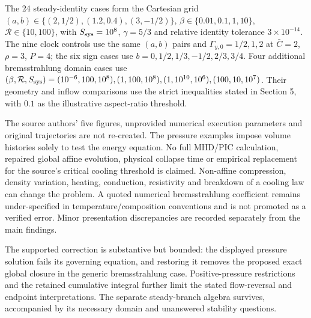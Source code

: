 The 24 steady-identity cases form the Cartesian grid
\((a,b)\in\{(2,1/2),(1.2,0.4),(3,-1/2)\}\),
\(\beta\in\{0.01,0.1,1,10\}\), \(\mathcal R\in\{10,100\}\), with
\(S_{\rm sys}=10^8\), \(\gamma=5/3\) and relative identity tolerance
\(3\times10^{-14}\). The nine clock controls use the same \((a,b)\)
pairs and \(\Gamma_{y,0}=1/2,1,2\) at \(\bar C=2\), \(\rho=3\), \(P=4\);
the six sign cases use \(b=0,1/2,1/3,-1/2,2/3,3/4\). Four additional
bremsstrahlung domain cases use
\((\beta,\mathcal R,S_{\rm sys})=(10^{-6},100,10^8),(1,100,10^8),(1,10^{10},10^6),(100,10,10^7)\).
Their geometry and inflow comparisons use the strict inequalities stated
in Section 5, with \(0.1\) as the illustrative aspect-ratio threshold.

The source authors' five figures, unprovided numerical execution
parameters and original trajectories are not re-created. The pressure
examples impose volume histories solely to test the energy equation. No
full MHD/PIC calculation, repaired global affine evolution, physical
collapse time or empirical replacement for the source's critical cooling
threshold is claimed. Non-affine compression, density variation,
heating, conduction, resistivity and breakdown of a cooling law can
change the problem. A quoted numerical bremsstrahlung coefficient
remains under-specified in temperature/composition conventions and is
not promoted as a verified error. Minor presentation discrepancies are
recorded separately from the main findings.

The supported correction is substantive but bounded: the displayed
pressure solution fails its governing equation, and restoring it removes
the proposed exact global closure in the generic bremsstrahlung case.
Positive-pressure restrictions and the retained cumulative integral
further limit the stated flow-reversal and endpoint interpretations. The
separate steady-branch algebra survives, accompanied by its necessary
domain and unanswered stability questions.

